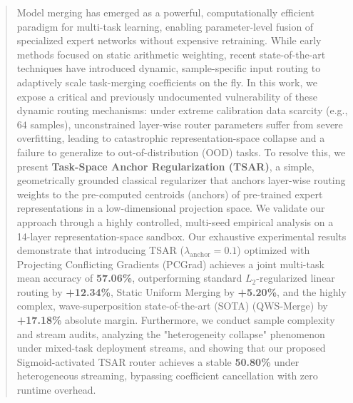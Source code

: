 \begin{abstract}
Model merging has emerged as a powerful, computationally efficient paradigm for multi-task
learning, enabling parameter-level fusion of specialized expert networks without expensive
retraining. 
While early methods focused on static arithmetic weighting, recent state-of-the-art techniques have
introduced dynamic, sample-specific input routing to adaptively scale task-merging coefficients on
the fly. 
In this work, we expose a critical and previously undocumented vulnerability of these dynamic
routing mechanisms: under extreme calibration data scarcity (e.g., $64$ samples), unconstrained
layer-wise router parameters suffer from severe overfitting, leading to catastrophic
representation-space collapse and a failure to generalize to out-of-distribution (OOD) tasks. 
To resolve this, we present \textbf{Task-Space Anchor Regularization (TSAR)}, a simple,
geometrically grounded classical regularizer that anchors layer-wise routing weights to the
pre-computed centroids (anchors) of pre-trained expert representations in a low-dimensional
projection space. 
We validate our approach through a highly controlled, multi-seed empirical analysis on a 14-layer
representation-space sandbox. 
Our exhaustive experimental results demonstrate that introducing TSAR
($\lambda_{\text{anchor}}=0.1$) optimized with Projecting Conflicting Gradients (PCGrad) achieves a
joint multi-task mean accuracy of \textbf{57.06\%}, outperforming standard $L_2$-regularized linear
routing by \textbf{+12.34\%}, Static Uniform Merging by \textbf{+5.20\%}, and the highly complex,
wave-superposition state-of-the-art (SOTA) (QWS-Merge) by \textbf{+17.18\%} absolute margin. 
Furthermore, we conduct sample complexity and stream audits, analyzing the "heterogeneity collapse"
phenomenon under mixed-task deployment streams, and showing that our proposed Sigmoid-activated TSAR
router achieves a stable \textbf{50.80\%} under heterogeneous streaming, bypassing coefficient
cancellation with zero runtime overhead.
\end{abstract}